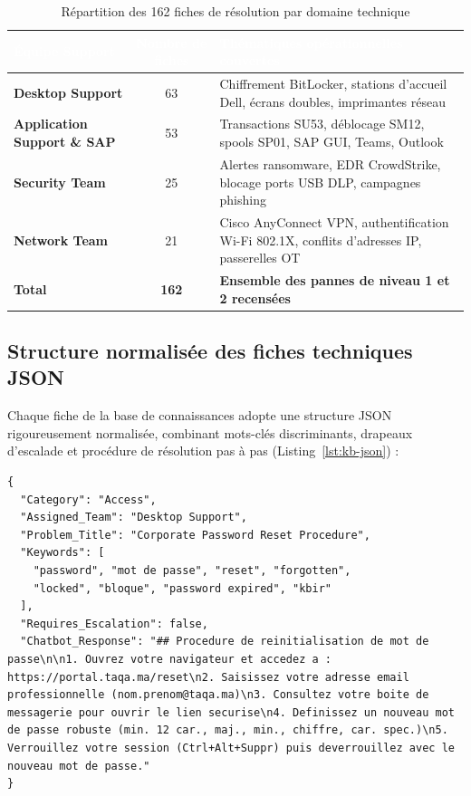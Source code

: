\documentclass[12pt, a4paper, oneside]{report}
\begin{document}
\begin{table}[H]
\centering
\caption{Répartition des 162 fiches de résolution par domaine technique}
\label{tab:kb-repartition}
\begin{tabularx}{\textwidth}{|>{\bfseries}p{4.5cm}|c|X|}
\hline
\rowcolor{themeDark}
\textcolor{white}{Équipe Support} &
\textcolor{white}{Nombre de fiches} &
\textcolor{white}{Thématiques opérationnelles couvertes} \\
\hline
Desktop Support & 63 & Chiffrement BitLocker, stations d'accueil Dell, écrans doubles, imprimantes réseau \\
\hline
Application Support \& SAP & 53 & Transactions SU53, déblocage SM12, spools SP01, SAP GUI, Teams, Outlook \\
\hline
Security Team & 25 & Alertes ransomware, EDR CrowdStrike, blocage ports USB DLP, campagnes phishing \\
\hline
Network Team & 21 & Cisco AnyConnect VPN, authentification Wi-Fi 802.1X, conflits d'adresses IP, passerelles OT \\
\hline
\textbf{Total} & \textbf{162} & \textbf{Ensemble des pannes de niveau 1 et 2 recensées} \\
\hline
\end{tabularx}
\end{table}

\subsection{Structure normalisée des fiches techniques JSON}

Chaque fiche de la base de connaissances adopte une structure JSON rigoureusement normalisée, combinant mots-clés discriminants, drapeaux d'escalade et procédure de résolution pas à pas (Listing~\ref{lst:kb-json}) :

\begin{lstlisting}[style=python, label={lst:kb-json},
  caption={Extrait d'une fiche technique normalisée -- \texttt{knowledge\_base.json}}]
{
  "Category": "Access",
  "Assigned_Team": "Desktop Support",
  "Problem_Title": "Corporate Password Reset Procedure",
  "Keywords": [
    "password", "mot de passe", "reset", "forgotten",
    "locked", "bloque", "password expired", "kbir"
  ],
  "Requires_Escalation": false,
  "Chatbot_Response": "## Procedure de reinitialisation de mot de passe\n\n1. Ouvrez votre navigateur et accedez a : https://portal.taqa.ma/reset\n2. Saisissez votre adresse email professionnelle (nom.prenom@taqa.ma)\n3. Consultez votre boite de messagerie pour ouvrir le lien securise\n4. Definissez un nouveau mot de passe robuste (min. 12 car., maj., min., chiffre, car. spec.)\n5. Verrouillez votre session (Ctrl+Alt+Suppr) puis deverrouillez avec le nouveau mot de passe."
}
\end{lstlisting}
\end{document}
